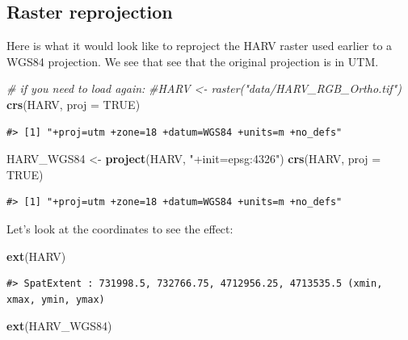 \documentclass[
]{book}
\newenvironment{Shaded}{\begin{snugshade}}{\end{snugshade}}
\newcommand{\AttributeTok}[1]{\textcolor[rgb]{0.13,0.29,0.53}{#1}}
\newcommand{\CommentTok}[1]{\textcolor[rgb]{0.56,0.35,0.01}{\textit{#1}}}
\newcommand{\ConstantTok}[1]{\textcolor[rgb]{0.56,0.35,0.01}{#1}}
\newcommand{\FunctionTok}[1]{\textcolor[rgb]{0.13,0.29,0.53}{\textbf{#1}}}
\newcommand{\NormalTok}[1]{#1}
\newcommand{\OtherTok}[1]{\textcolor[rgb]{0.56,0.35,0.01}{#1}}
\newcommand{\StringTok}[1]{\textcolor[rgb]{0.31,0.60,0.02}{#1}}
\begin{document}
\hypertarget{raster-reprojection}{%
\subsection{Raster reprojection}\label{raster-reprojection}}

Here is what it would look like to reproject the HARV raster used earlier to a WGS84 projection. We see that see that the original projection is in UTM.

\begin{Shaded}
\begin{Highlighting}[]
\CommentTok{\# if you need to load again:}
\CommentTok{\#HARV \textless{}{-} raster("data/HARV\_RGB\_Ortho.tif")}
\FunctionTok{crs}\NormalTok{(HARV, }\AttributeTok{proj =} \ConstantTok{TRUE}\NormalTok{)}
\end{Highlighting}
\end{Shaded}

\begin{verbatim}
#> [1] "+proj=utm +zone=18 +datum=WGS84 +units=m +no_defs"
\end{verbatim}

\begin{Shaded}
\begin{Highlighting}[]
\NormalTok{HARV\_WGS84 }\OtherTok{\textless{}{-}} \FunctionTok{project}\NormalTok{(HARV, }\StringTok{"+init=epsg:4326"}\NormalTok{)}
\FunctionTok{crs}\NormalTok{(HARV, }\AttributeTok{proj =} \ConstantTok{TRUE}\NormalTok{)}
\end{Highlighting}
\end{Shaded}

\begin{verbatim}
#> [1] "+proj=utm +zone=18 +datum=WGS84 +units=m +no_defs"
\end{verbatim}

Let's look at the coordinates to see the effect:

\begin{Shaded}
\begin{Highlighting}[]
\FunctionTok{ext}\NormalTok{(HARV)}
\end{Highlighting}
\end{Shaded}

\begin{verbatim}
#> SpatExtent : 731998.5, 732766.75, 4712956.25, 4713535.5 (xmin, xmax, ymin, ymax)
\end{verbatim}

\begin{Shaded}
\begin{Highlighting}[]
\FunctionTok{ext}\NormalTok{(HARV\_WGS84)}
\end{Highlighting}
\end{Shaded}
\end{document}
